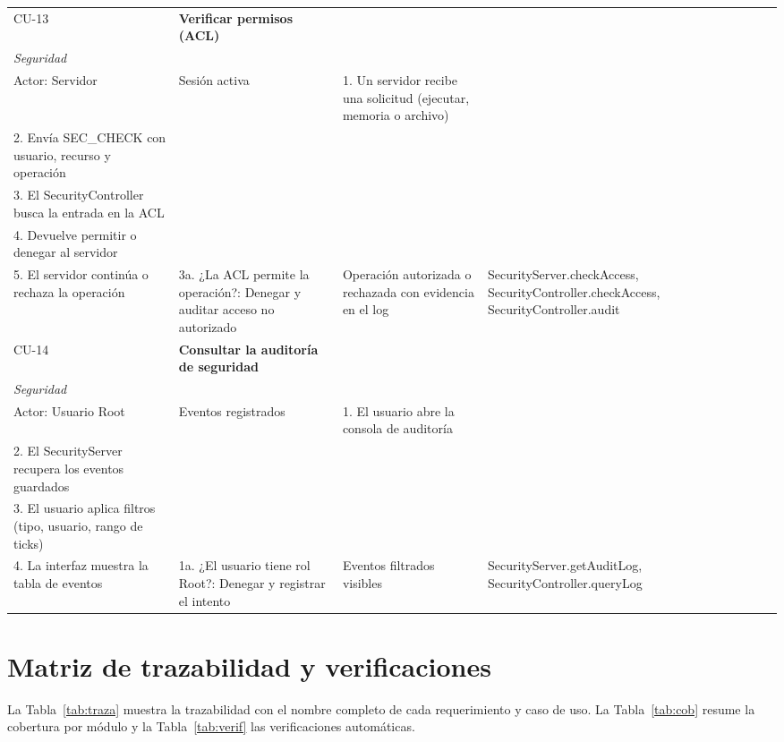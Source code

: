 \documentclass[conference]{IEEEtran}
\begin{document}
\begin{table}[!t]
\begin{tabular}{|>{\raggedright}p{0.8cm}|>{\raggedright}p{2.1cm}|>{\raggedright}p{1.7cm}|>{\raggedright}p{4.7cm}|>{\raggedright}p{2.9cm}|>{\raggedright}p{1.8cm}|>{\raggedright}p{2.9cm}|}
CU-13 & \textbf{Verificar permisos (ACL)}\\ \textit{Seguridad}\\ Actor: Servidor & Sesión activa & 1. Un servidor recibe una solicitud (ejecutar, memoria o archivo)\\ 2. Envía SEC\_CHECK con usuario, recurso y operación\\ 3. El SecurityController busca la entrada en la ACL\\ 4. Devuelve permitir o denegar al servidor\\ 5. El servidor continúa o rechaza la operación & 3a. ¿La ACL permite la operación?: Denegar y auditar acceso no autorizado & Operación autorizada o rechazada con evidencia en el log & SecurityServer.\allowbreak checkAccess, SecurityController.\allowbreak checkAccess, SecurityController.\allowbreak audit\tabularnewline \hline
CU-14 & \textbf{Consultar la auditoría de seguridad}\\ \textit{Seguridad}\\ Actor: Usuario Root & Eventos registrados & 1. El usuario abre la consola de auditoría\\ 2. El SecurityServer recupera los eventos guardados\\ 3. El usuario aplica filtros (tipo, usuario, rango de ticks)\\ 4. La interfaz muestra la tabla de eventos & 1a. ¿El usuario tiene rol Root?: Denegar y registrar el intento & Eventos filtrados visibles & SecurityServer.\allowbreak getAuditLog, SecurityController.\allowbreak queryLog\tabularnewline \hline
\end{tabular}
\end{table}

\clearpage
\section{Matriz de trazabilidad y verificaciones}\label{ax:traza}
La Tabla~\ref{tab:traza} muestra la trazabilidad con el nombre completo de cada requerimiento y caso de uso. La Tabla~\ref{tab:cob} resume la cobertura por módulo y la Tabla~\ref{tab:verif} las verificaciones automáticas.
\end{document}
